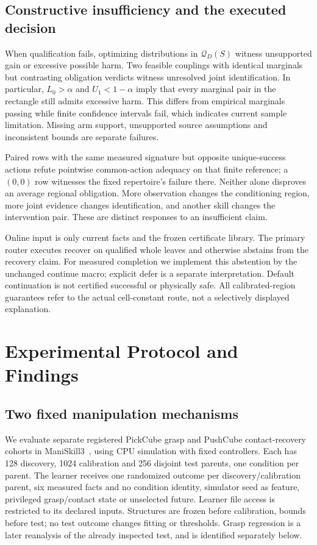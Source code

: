 \documentclass[conference]{IEEEtran}
\newcommand{\Q}{\mathcal{Q}}
\begin{document}
\subsection{Constructive insufficiency and the executed decision}
When qualification fails, optimizing distributions in $\Q_D(S)$ witness unsupported gain or excessive possible harm. Two feasible couplings with identical marginals but contrasting obligation verdicts witness unresolved joint identification. In particular, $L_0>\alpha$ and $U_1<1-\alpha$ imply that every marginal pair in the rectangle still admits excessive harm. This differs from empirical marginals passing while finite confidence intervals fail, which indicates current sample limitation. Missing arm support, unsupported source assumptions and inconsistent bounds are separate failures.

Paired rows with the same measured signature but opposite unique-success actions refute pointwise common-action adequacy on that finite reference; a $(0,0)$ row witnesses the fixed repertoire's failure there. Neither alone disproves an average regional obligation. More observation changes the conditioning region, more joint evidence changes identification, and another skill changes the intervention pair. These are distinct responses to an insufficient claim.

Online input is only current facts and the frozen certificate library. The primary router executes recover on qualified whole leaves and otherwise abstains from the recovery claim. For measured completion we implement this abstention by the unchanged continue macro; explicit defer is a separate interpretation. Default continuation is not certified successful or physically safe. All calibrated-region guarantees refer to the actual cell-constant route, not a selectively displayed explanation.

\section{Experimental Protocol and Findings}
\subsection{Two fixed manipulation mechanisms}
We evaluate separate registered PickCube grasp and PushCube contact-recovery cohorts in ManiSkill3~\cite{maniskill}, using CPU simulation with fixed controllers. Each has 128 discovery, 1024 calibration and 256 disjoint test parents, one condition per parent. The learner receives one randomized outcome per discovery/calibration parent, six measured facts and no condition identity, simulator seed as feature, privileged grasp/contact state or unselected future. Learner file access is restricted to its declared inputs. Structures are frozen before calibration, bounds before test; no test outcome changes fitting or thresholds. Grasp regression is a later reanalysis of the already inspected test, and is identified separately below.
\end{document}
